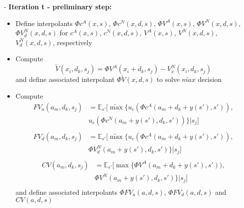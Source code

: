 \documentclass{beamer}
\begin{document}
\begin{frame}
  \footnotesize
  - \textbf{Iteration t - preliminary step:}
  \begin{itemize}
  \item Define interpolants $\Phi c^A(x, s)$, $\Phi c^N(x, d, s)$, $\Phi V^A(x, s)$, $\Phi V^N(x, d, s)$, $\Phi V_d^N(x, d, s)$ for $c^A(x, s)$, $c^N(x, d, s)$, $V^A(x, s)$, $V^N(x, d, s)$, $V_d^N(x, d, s)$, respectively
  \item Compute
  \begin{equation*}
    \tilde{V}(x_i, d_k, s_j) = \Phi V^A(x_i+d_k, s_j)-V^N_x(x_i, d_k, s_j)
  \end{equation*}
  and define associated interpolant $\Phi \tilde{V}(x, d, s)$  to solve $\tilde{max}$ decision
  \item Compute
  \begin{equation*}
    \begin{split}
    FV_a(a_m,d_k,s_j) &= \mathbb{E}_{s'} [\tilde{\max}\{u_c(\Phi c^A(a_m+d_k+y(s'), s')),\\
    & u_c(\Phi c^N(a_m+y(s'), d_k, s'))\}|s_j]\\
    \end{split}
  \end{equation*}
  \begin{equation*}
    \begin{split}
    FV_d(a_m,d_k,s_j) &= \mathbb{E}_{s'} [\tilde{\max}\{u_c(\Phi c^A(a_m+d_k+y(s'), s')),\\
    & \Phi V^N_d(a_m+y(s'), d_k, s')\}|s_j]\\
    \end{split}
  \end{equation*}
  \begin{equation*}
    \begin{split}
    CV(a_m,d_k,s_j) &= \mathbb{E}_{s'} [\max\{\Phi V^A(a_m+d_k+y(s'), s')),\\
    & \Phi V^N(a_m+y(s'), d_k, s')\}|s_j]\\
    \end{split}
  \end{equation*}
  and define associated interpolants $\Phi FV_a(a,d,s)$, $\Phi FV_d(a,d,s)$ and $CV(a,d,s)$
  \end{itemize}
\end{frame}
\end{document}

